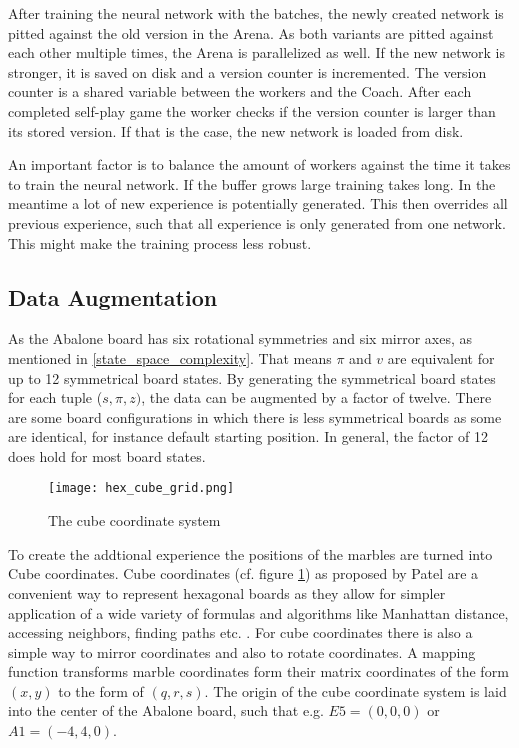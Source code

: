 After training the neural network with the batches, the newly created network is pitted against the old version in the Arena. As both variants are pitted against each other multiple times, the Arena is parallelized as well. If the new network is stronger, it is saved on disk and a version counter is incremented. The version counter is a shared variable between the workers and the Coach. After each completed self-play game the worker checks if the version counter is larger than its stored version. If that is the case, the new network is loaded from disk.

An important factor is to balance the amount of workers against the time it takes to train the neural network. If the buffer grows large training takes long. In the meantime a lot of new experience is potentially generated. This then overrides all previous experience, such that all experience is only generated from one network. This might make the training process less robust.

\subsection{Data Augmentation}
As the Abalone board has six rotational symmetries and six mirror axes, as mentioned in \ref{state_space_complexity}. That means $\pi$ and $v$ are equivalent for up to 12 symmetrical board states. By generating the symmetrical board states for each tuple ($s, \pi, z)$, the data can be augmented by a factor of twelve. There are some board configurations in which there is less symmetrical boards as some are identical, for instance default starting position. In general, the factor of 12 does hold for most board states.

\begin{figure}
    \centering
    \texttt{[image: hex\_cube\_grid.png]}
    \caption{The cube coordinate system \cite{noauthor_red_nodate}}
    \label{cube_coordinate_grid}
\end{figure}

To create the addtional experience the positions of the marbles are turned into Cube coordinates. Cube coordinates (cf. figure \ref{cube_coordinate_grid}) as proposed by Patel \cite{noauthor_red_nodate} are a convenient way to represent hexagonal boards as they allow for simpler application of a wide variety of formulas and algorithms like Manhattan distance, accessing neighbors, finding paths etc. . For cube coordinates there is also a simple way to mirror coordinates and also to rotate coordinates. A mapping function transforms marble coordinates form their matrix coordinates of the form $(x, y)$ to the form of $(q, r, s)$. The origin of the cube coordinate system is laid into the center of the Abalone board, such that e.g. $E5 = (0, 0, 0)$ or $A1 = (-4, 4, 0)$.

